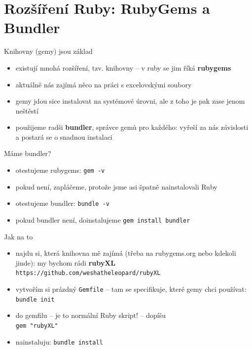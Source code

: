\documentclass{beamer}
\begin{document}
\section{Rozšíření Ruby: RubyGems a Bundler}

\begin{frame}{Knihovny (gemy) jsou základ}
  \begin{itemize}
    \item existují mnohá rozšíření, tzv. knihovny -- v ruby se jim říká \textbf{rubygems}
    \item aktuálně nás zajímá něco na práci s excelovskými soubory
    \item gemy jdou sice instalovat na systémové úrovni, ale z toho je pak zase jenom neštěstí
    \item použijeme radši \textbf{bundler}, správce gemů pro každého: vyřeší za nás závislosti a postará se o snadnou instalaci
  \end{itemize}
\end{frame}

\begin{frame}{Máme bundler?}
  \begin{itemize}
    \item otestujeme rubygems: \texttt{gem -v}
    \item pokud není, zapláčeme, protože jsme asi špatně nainstalovali Ruby
    \item otestujeme bundler: \texttt{bundle -v}
    \item pokud bundler není, doinstalujeme \texttt{gem install bundler}
  \end{itemize}
\end{frame}

\begin{frame}{Jak na to}
  \begin{itemize}
    \item najdu si, která knihovna mě zajímá (třeba na rubygems.org nebo kdekoli jinde): my bychom rádi \textbf{rubyXL} \texttt{https://github.com/weshatheleopard/rubyXL}
    \item vytvořím si prázdný \texttt{Gemfile} -- tam se specifikuje, které gemy chci používat: \texttt{bundle init}
    \item do gemfilu -- je to normální Ruby skript! -- dopíšu\\ \texttt{gem "rubyXL"}
    \item nainstaluju: \texttt{bundle install}
  \end{itemize}
\end{frame}
\end{document}
